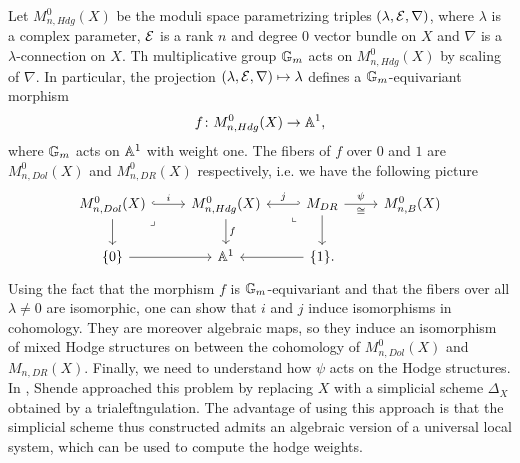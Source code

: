 \documentclass{article}
\begin{document}
Let $M_{n, Hdg}^0(X)$ be the moduli space parametrizing triples $(\lambda, \mathcal{E}, \nabla)$, where $\lambda$ is a complex parameter, $\mathcal{E}$ is a rank $n$ and degree $0$ vector bundle on $X$ and $\nabla$ is a $\lambda$-connection on $X$. Th multiplicative group $\mathbb{G}_m$ acts on $M_{n, Hdg}^0(X)$ by scaling of $\nabla$. In particular, the projection $(\lambda, \mathcal{E}, \nabla) \mapsto \lambda$ defines a $\mathbb{G}_m$-equivariant morphism
\begin{equation}
f \colon M_{n, Hdg}^0(X) \to \mathbb{A}^1,
\end{equation}
where $\mathbb{G}_m$ acts on $\mathbb{A}^1$ with weight one. The fibers of $f$ over $0$ and $1$ are $M_{n, Dol}^0(X)$ and $M_{n, DR}^0(X)$ respectively, i.e. we have the following picture
\begin{equation}
\begin{tikzcd}
	{M_{n, Dol}^0(X)} & {M_{n,Hdg}^0(X)} & {M_{DR}} & {M_{n,B}^0(X)} \\
	{\{ 0 \}} & {\Ab^1} & {\{ 1 \}.}
	\arrow["i", hook, from=1-1, to=1-2]
	\arrow[from=1-1, to=2-1]
	\arrow["\lrcorner"{anchor=center, pos=0.125}, draw=none, from=1-1, to=2-2]
	\arrow["f", from=1-2, to=2-2]
	\arrow["j"', hook', from=1-3, to=1-2]
	\arrow["\psi", "\cong"', from=1-3, to=1-4]
	\arrow["\lrcorner"{anchor=center, pos=0.125, rotate=-90}, draw=none, from=1-3, to=2-2]
	\arrow[from=1-3, to=2-3]
	\arrow[from=2-1, to=2-2]
	\arrow[from=2-3, to=2-2]
\end{tikzcd} \label{moduli diagram}
\end{equation}
Using the fact that the morphism $f$ is $\mathbb{G}_m$-equivariant and that the fibers over all $\lambda \neq 0$ are isomorphic, one can show that $i$ and $j$ induce isomorphisms in cohomology. They are moreover algebraic maps, so they induce an isomorphism of mixed Hodge structures on between the cohomology of $M_{n,Dol}^0(X)$ and $M_{n, DR}(X)$. Finally, we need to understand how $\psi$ acts on the Hodge structures. In \cite[]{Shende-weights}, Shende approached this problem by replacing $X$ with a simplicial scheme $\Delta_X$ obtained by a trialeftngulation. The advantage of using this approach is that the simplicial scheme thus constructed admits an algebraic version of a universal local system, which can be used to compute the hodge weights.
\end{document}
